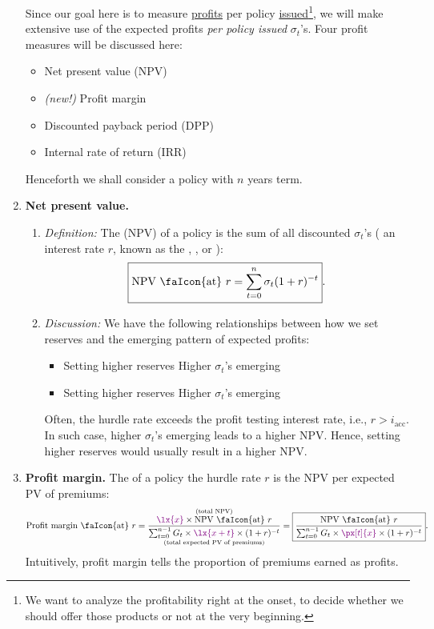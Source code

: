 \begin{enumerate}
Since our goal here is to measure \underline{profits} per policy
\underline{issued}\footnote{We want to analyze the profitability right at the
onset, to decide whether we should offer those products or not at the very
beginning.}, we will make extensive use of the expected profits \emph{per policy
issued} \(\sigma_t\)'s. Four profit measures will be discussed here:
\begin{itemize}
\item Net present value (NPV)
\item \emph{(new!)} Profit margin
\item Discounted payback period (DPP)
\item Internal rate of return (IRR)
\end{itemize}
\begin{note}
Henceforth we shall consider a policy with \(n\) years term.
\end{note}

\item \label{it:npv-fmla} \textbf{Net present value.}
\begin{enumerate}[label={(\arabic*)}]
\item \emph{Definition:} The  (NPV) of a policy is the
sum of all discounted \(\sigma_t\)'s ( an interest rate \(r\), known
as the , , or ):
\[
\boxed{\text{NPV \faIcon{at} \(r\)}=\sum_{t=0}^{n}\sigma_t(1+r)^{-t}}.
\]
\item \emph{Discussion:} We have the following relationships between how we
set reserves and the emerging pattern of expected profits:
\begin{itemize}
\item Setting higher reserves   Higher \(\sigma_t\)'s emerging 
\item Setting higher reserves   Higher \(\sigma_t\)'s emerging 
\end{itemize}
Often, the hurdle rate exceeds the profit testing interest rate, i.e.,
\(r>i_{\mathrm{acc}}\). In such case, higher \(\sigma_t\)'s emerging
 leads to a higher NPV. Hence, setting higher reserves 
would usually result in a higher NPV.
\end{enumerate}

\item \label{it:profit-marg-fmla} \textbf{Profit margin.}
The  of a policy  the hurdle rate \(r\) is the
NPV per expected PV of premiums:
\[
\text{Profit margin \faIcon{at} \(r\)}
=\frac{\overset{\text{(total NPV)}}{\vc{\lx{x}}\times \text{NPV \faIcon{at} \(r\)}}}
{\underset{\text{(total expected PV of premiums)}}{\sum_{t=0}^{n-1}G_t\times \vc{\lx{x+t}}\times (1+r)^{-t}}}
=\boxed{\frac{\text{NPV \faIcon{at} \(r\)}}
{\sum_{t=0}^{n-1}G_t\times \vc{\px[t]{x}}\times (1+r)^{-t}}}.
\]
Intuitively, profit margin tells the proportion of premiums earned as profits.


\end{enumerate}
